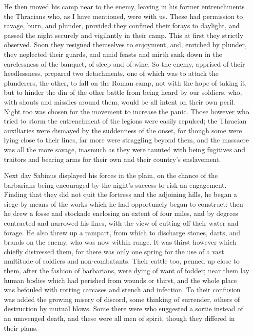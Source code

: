 
He then moved his camp near to the enemy, leaving in his former entrenchments the Thracians who, as I have mentioned, were with us. These had permission to ravage, burn, and plunder, provided they confined their forays to daylight, and passed the night securely and vigilantly in their camp. This at first they strictly observed. Soon they resigned themselves to enjoyment, and, enriched by plunder, they neglected their guards, and amid feasts and mirth sank down in the carelessness of the banquet, of sleep and of wine. So the enemy, apprised of their heedlessness, prepared two detachments, one of which was to attack the plunderers, the other, to fall on the Roman camp, not with the hope of taking it, but to hinder the din of the other battle from being heard by our soldiers, who, with shouts and missiles around them, would be all intent on their own peril. Night too was chosen for the movement to increase the panic. Those however who tried to storm the entrenchment of the legions were easily repulsed; the Thracian auxiliaries were dismayed by the suddenness of the onset, for though some were lying close to their lines, far more were straggling beyond them, and the massacre was all the more savage, inasmuch as they were taunted with being fugitives and traitors and bearing arms for their own and their country's enslavement.


Next day Sabinus displayed his forces in the plain, on the chance of the barbarians being encouraged by the night's success to risk an engagement. Finding that they did not quit the fortress and the adjoining hills, he began a siege by means of the works which he had opportunely began to construct; then he drew a fosse and stockade enclosing an extent of four miles, and by degrees contracted and narrowed his lines, with the view of cutting off their water and forage. He also threw up a rampart, from which to discharge stones, darts, and brands on the enemy, who was now within range. It was thirst however which chiefly distressed them, for there was only one spring for the use of a vast multitude of soldiers and non-combatants. Their cattle too, penned up close to them, after the fashion of barbarians, were dying of want of fodder; near them lay human bodies which had perished from wounds or thirst, and the whole place was befouled with rotting carcases and stench and infection. To their confusion was added the growing misery of discord, some thinking of surrender, others of destruction by mutual blows. Some there were who suggested a sortie instead of an unavenged death, and these were all men of spirit, though they differed in their plans.

